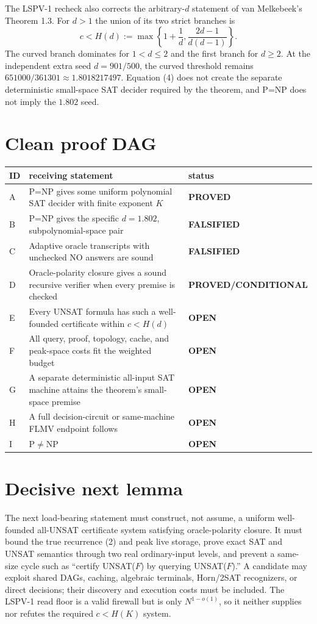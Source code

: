 \documentclass[11pt]{article}
\newcommand{\status}[1]{\textbf{#1}}
\begin{document}
The LSPV-1 recheck also corrects the arbitrary-$d$ statement of van
Melkebeek's Theorem 1.3.  For $d>1$ the union of its two strict branches is
\[
 c<H(d):=\max\left\{1+\frac1d,
                     \frac{2d-1}{d(d-1)}\right\}.          \tag{4}
\]
The curved branch dominates for $1<d\le2$ and the first branch for $d\ge2$.
At the independent extra seed $d=901/500$, the curved threshold remains
$651000/361301\approx1.8018217497$.  Equation (4) does not create the separate
deterministic small-space SAT decider required by the theorem, and P=NP does
not imply the $1.802$ seed.

\section*{Clean proof DAG}
\begin{center}
\begin{tabularx}{.97\linewidth}{@{}p{.07\linewidth}X p{.20\linewidth}@{}}
\toprule
ID & receiving statement & status\\
\midrule
A & P=NP gives some uniform polynomial SAT decider with finite exponent $K$ & \status{PROVED}\\
B & P=NP gives the specific $d=1.802$, subpolynomial-space pair & \status{FALSIFIED}\\
C & Adaptive oracle transcripts with unchecked NO answers are sound & \status{FALSIFIED}\\
D & Oracle-polarity closure gives a sound recursive verifier when every premise is checked & \status{PROVED/CONDITIONAL}\\
E & Every UNSAT formula has such a well-founded certificate within $c<H(d)$ & \status{OPEN}\\
F & All query, proof, topology, cache, and peak-space costs fit the weighted budget & \status{OPEN}\\
G & A separate deterministic all-input SAT machine attains the theorem's small-space premise & \status{OPEN}\\
H & A full decision-circuit or same-machine FLMV endpoint follows & \status{OPEN}\\
I & P$\ne$NP & \status{OPEN}\\
\bottomrule
\end{tabularx}
\end{center}

\section*{Decisive next lemma}
The next load-bearing statement must construct, not assume, a uniform
well-founded all-UNSAT certificate system satisfying oracle-polarity closure.
It must bound the true recurrence (2) and peak live storage, prove exact SAT
and UNSAT semantics through two real ordinary-input levels, and prevent a
same-size cycle such as ``certify UNSAT($F$) by querying UNSAT($F$).''  A
candidate may exploit shared DAGs, caching, algebraic terminals, Horn/2SAT
recognizers, or direct decisions; their discovery and execution costs must be
included.  The LSPV-1 read floor is a valid firewall but is only
$N^{1-o(1)}$, so it neither supplies nor refutes the required $c<H(K)$ system.
\end{document}
